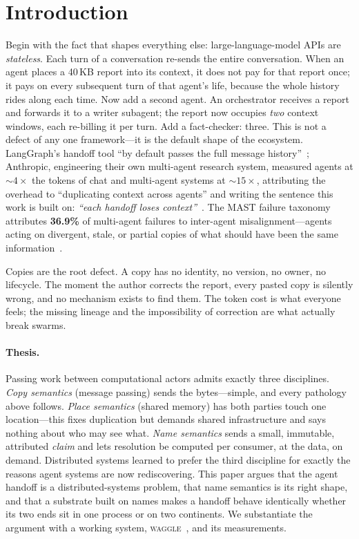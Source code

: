 \documentclass[10pt,twocolumn]{article}
\begin{document}
\section{Introduction}

Begin with the fact that shapes everything else: large-language-model
APIs are \emph{stateless}. Each turn of a conversation re-sends the entire
conversation. When an agent places a 40\,KB report into its context, it
does not pay for that report once; it pays on every subsequent turn of
that agent's life, because the whole history rides along each time. Now
add a second agent. An orchestrator receives a report and forwards it to
a writer subagent; the report now occupies \emph{two} context windows,
each re-billing it per turn. Add a fact-checker: three. This is not a
defect of any one framework---it is the default shape of the ecosystem.
LangGraph's handoff tool ``by default passes the full message
history''~\citep{langgraph}; Anthropic, engineering their own multi-agent
research system, measured agents at ${\sim}4\times$ the tokens of chat and
multi-agent systems at ${\sim}15\times$, attributing the overhead to
``duplicating context across agents'' and writing the sentence this work
is built on: \emph{``each handoff loses context''}~\citep{anthropic2025}.
The MAST failure taxonomy attributes \textbf{36.9\%} of multi-agent
failures to inter-agent misalignment---agents acting on divergent, stale,
or partial copies of what should have been the same
information~\citep{cemri2025}.

Copies are the root defect. A copy has no identity, no version, no owner,
no lifecycle. The moment the author corrects the report, every pasted copy
is silently wrong, and no mechanism exists to find them. The token cost is
what everyone feels; the missing lineage and the impossibility of
correction are what actually break swarms.

\paragraph{Thesis.} Passing work between computational actors admits
exactly three disciplines. \emph{Copy semantics} (message passing) sends
the bytes---simple, and every pathology above follows. \emph{Place
semantics} (shared memory) has both parties touch one location---this
fixes duplication but demands shared infrastructure and says nothing about
who may see what. \emph{Name semantics} sends a small, immutable,
attributed \emph{claim} and lets resolution be computed per consumer, at
the data, on demand. Distributed systems learned to prefer the third
discipline for exactly the reasons agent systems are now
rediscovering. This paper argues that the agent handoff is a
distributed-systems problem, that name semantics is its right shape, and
that a substrate built on names makes a handoff behave identically whether
its two ends sit in one process or on two continents. We substantiate the
argument with a working system, \textsc{waggle}~\citep{waggle2026}, and
its measurements.
\end{document}
